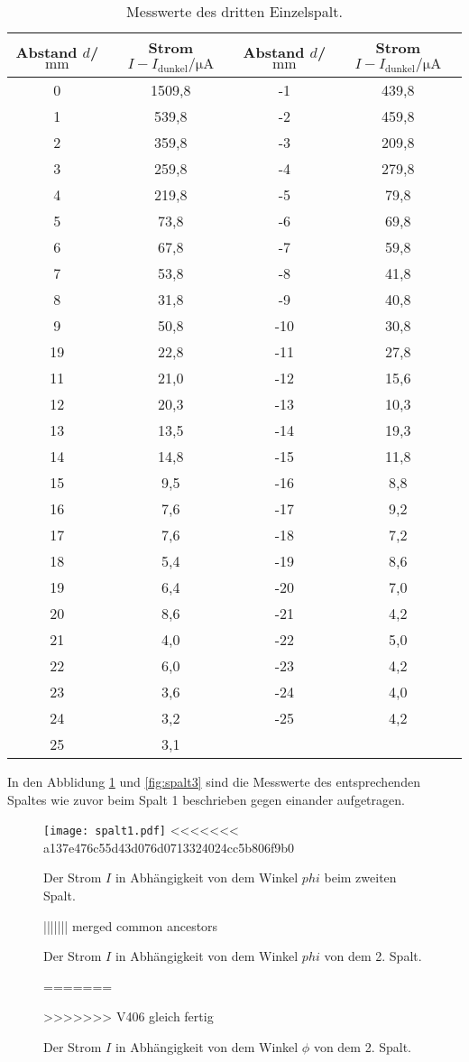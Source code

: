 \begin{table}
  \centering
  \caption{Messwerte des dritten Einzelspalt.}
  \label{tab:spalt3}
  \begin{tabular}{c c c c}
Abstand $d$/$\si{\milli\meter}$ & Strom $I-I_\mathrm{dunkel}/\si{\micro\ampere}$&Abstand $d$/$\si{\milli\meter}$ & Strom $I-I_\mathrm{dunkel}/\si{\micro\ampere}$\\
  \midrule
  0  & 1509,8 & -1 & 439,8\\
  1  & 539,8  & -2 & 459,8\\
  2  & 359,8  & -3 & 209,8\\
  3  & 259,8  & -4 & 279,8\\
  4  & 219,8  & -5 &  79,8\\
  5  & 73,8   & -6 &  69,8\\
  6  & 67,8   & -7 &  59,8\\
  7  & 53,8   & -8 &  41,8\\
  8  & 31,8   & -9 &  40,8\\
  9  & 50,8   & -10 & 30,8\\
  19 & 22,8   & -11 & 27,8\\
  11 & 21,0   & -12 & 15,6\\
  12 & 20,3   & -13 & 10,3\\
  13 & 13,5   & -14 & 19,3\\
  14 & 14,8   & -15 & 11,8\\
  15 & 9,5    & -16 &  8,8\\
  16 & 7,6    & -17 &  9,2\\
  17 & 7,6    & -18 &  7,2\\
  18 & 5,4    & -19 &  8,6\\
  19 & 6,4    & -20 &  7,0\\
  20 & 8,6    & -21 &  4,2\\
  21 & 4,0    & -22 &  5,0\\
  22 & 6,0    & -23 &  4,2\\
  23 & 3,6    & -24 &  4,0\\
  24 & 3,2    & -25 &  4,2\\
  25 & 3,1    &     &     \\
  \bottomrule
  \end{tabular}
\end{table}
\FloatBarrier

In den Abblidung \ref{fig:spalt2} und \ref{fig:spalt3} sind
die Messwerte des entsprechenden Spaltes wie zuvor beim Spalt 1 beschrieben
gegen einander aufgetragen.


\begin{figure}
  \centering
  \texttt{[image: spalt1.pdf]}
<<<<<<< a137e476c55d43d076d0713324024cc5b806f9b0
  \caption{ Der Strom $I$ in Abhängigkeit von dem Winkel $phi$ beim zweiten Spalt.}
||||||| merged common ancestors
  \caption{ Der Strom $I$ in Abhängigkeit von dem Winkel $phi$ von dem 2. Spalt.}
=======
  \caption{ Der Strom $I$ in Abhängigkeit von dem Winkel $\phi$ von dem 2. Spalt.}
>>>>>>> V406 gleich fertig
  \label{fig:spalt2}
\end{figure}
\FloatBarrier

